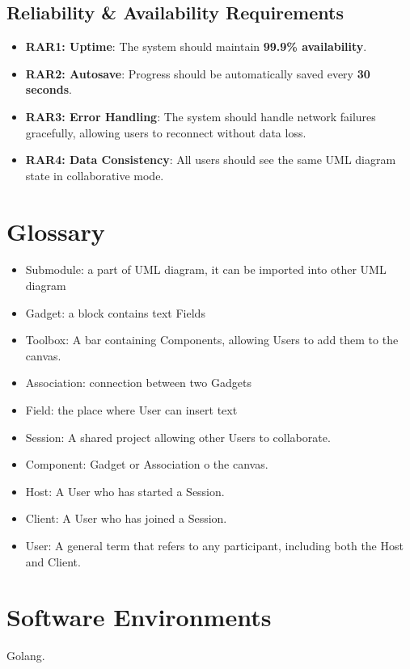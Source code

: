\documentclass[12pt]{article}
\begin{document}
\subsection{Reliability \& Availability Requirements}
\begin{itemize}
    \item \textbf{RAR1: Uptime}: The system should maintain \textbf{99.9\% availability}.
    \item \textbf{RAR2: Autosave}: Progress should be automatically saved every \textbf{30 seconds}.
    \item \textbf{RAR3: Error Handling}: The system should handle network failures gracefully, allowing users to reconnect without data loss.
    \item \textbf{RAR4: Data Consistency}: All users should see the same UML diagram state in collaborative mode.
\end{itemize}

\section{Glossary}
    \begin{itemize}
        \item Submodule: a part of UML diagram, it can be imported into other UML diagram
        \item Gadget: a block contains text Fields
        \item Toolbox: A bar containing  Components, allowing Users to add them to the canvas.
        \item Association: connection between two Gadgets
        \item Field: the place where User can insert text
        \item Session: A shared project allowing other Users to collaborate.
        \item Component: Gadget or Association o the canvas.
        \item Host: A User who has started a Session.
        \item Client: A User who has joined a Session.
        \item User: A general term that refers to any participant, including both the Host and Client.
    \end{itemize}




\section{Software Environments}
Golang.
\end{document}
